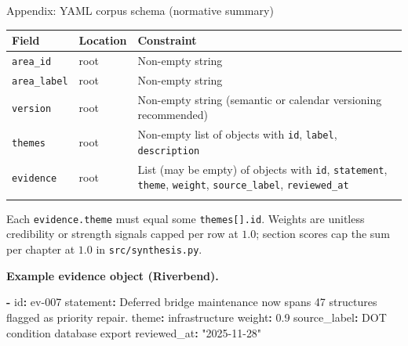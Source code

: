 \documentclass[
  ignorenonframetext,
]{beamer}
\author{\texorpdfstring{}{}}
\date{}
\newenvironment{Shaded}{}{}
\newcommand{\AttributeTok}[1]{\textcolor[rgb]{0.49,0.56,0.16}{#1}}
\newcommand{\FloatTok}[1]{\textcolor[rgb]{0.25,0.63,0.44}{#1}}
\newcommand{\FunctionTok}[1]{\textcolor[rgb]{0.02,0.16,0.49}{#1}}
\newcommand{\KeywordTok}[1]{\textcolor[rgb]{0.00,0.44,0.13}{\textbf{#1}}}
\newcommand{\StringTok}[1]{\textcolor[rgb]{0.25,0.44,0.63}{#1}}
\newcounter{none} %
\begin{document}
\begin{frame}[fragile]{Appendix: YAML corpus schema (normative summary)}
\protect{}\label{appendix-yaml-corpus-schema-normative-summary}
{\def\LTcaptype{none} %
\begin{longtable}[]{@{}
  >{\raggedright\arraybackslash}p{}
  >{\raggedright\arraybackslash}p{}
  >{\raggedright\arraybackslash}p{}@{}}
\toprule\noalign{}
\begin{minipage}[b]{\linewidth}\raggedright
Field
\end{minipage} & \begin{minipage}[b]{\linewidth}\raggedright
Location
\end{minipage} & \begin{minipage}[b]{\linewidth}\raggedright
Constraint
\end{minipage} \\
\midrule\noalign{}
\endhead
\texttt{area\_id} & root & Non-empty string \\
\texttt{area\_label} & root & Non-empty string \\
\texttt{version} & root & Non-empty string (semantic or calendar
versioning recommended) \\
\texttt{themes} & root & Non-empty list of objects with \texttt{id},
\texttt{label}, \texttt{description} \\
\texttt{evidence} & root & List (may be empty) of objects with
\texttt{id}, \texttt{statement}, \texttt{theme}, \texttt{weight},
\texttt{source\_label}, \texttt{reviewed\_at} \\
\bottomrule\noalign{}
\end{longtable}
}

Each \texttt{evidence.theme} must equal some \texttt{themes{[}{]}.id}.
Weights are unitless credibility or strength signals capped per row at
\(1.0\); section scores cap the sum per chapter at \(1.0\) in
\texttt{src/synthesis.py}.

\textbf{Example evidence object (Riverbend).}

\begin{Shaded}
\begin{Highlighting}[]
\KeywordTok{{-}}\AttributeTok{ }\FunctionTok{id}\KeywordTok{:}\AttributeTok{ ev{-}007}
\AttributeTok{  }\FunctionTok{statement}\KeywordTok{:}\AttributeTok{ Deferred bridge maintenance now spans 47 structures flagged as priority repair.}
\AttributeTok{  }\FunctionTok{theme}\KeywordTok{:}\AttributeTok{ infrastructure}
\AttributeTok{  }\FunctionTok{weight}\KeywordTok{:}\AttributeTok{ }\FloatTok{0.9}
\AttributeTok{  }\FunctionTok{source\_label}\KeywordTok{:}\AttributeTok{ DOT condition database export}
\AttributeTok{  }\FunctionTok{reviewed\_at}\KeywordTok{:}\AttributeTok{ }\StringTok{"2025{-}11{-}28"}
\end{Highlighting}
\end{Shaded}


\end{frame}
\end{document}
